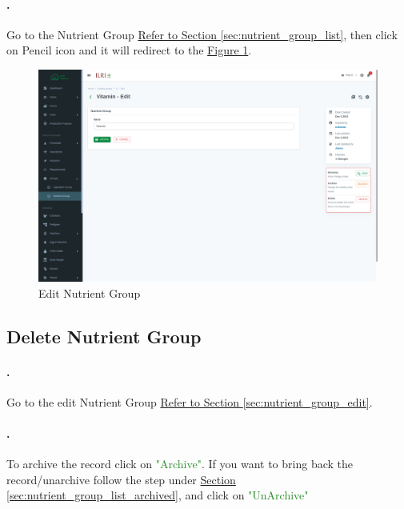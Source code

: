 \paragraph{.}Go to the Nutrient Group \hyperref[sec:nutrient_group_list]{Refer to Section \ref{sec:nutrient_group_list}}, then click on Pencil icon and it will redirect to the \hyperref[fig:nutrient_group_edit_page]{Figure \ref{fig:nutrient_group_edit_page}}.
\begin{figure}[h!]
  	\includegraphics[width=15cm]{screenshots/nutrient_group_edit_page.png}
  	\caption{Edit Nutrient Group}
  	\label{fig:nutrient_group_edit_page}
\end{figure}

\subsection{Delete Nutrient Group}
\setcounter{stepcounter}{1}
\paragraph{.}Go to the edit Nutrient Group \hyperref[sec:nutrient_group_edit]{Refer to Section \ref{sec:nutrient_group_edit}}.

\paragraph{.}To archive the record click on \textcolor{ForestGreen}{"Archive"}. If you want to bring back the record/unarchive follow the step under \hyperref[sec:nutrient_group_list_archived]{Section  \ref{sec:nutrient_group_list_archived}}, and click on \textcolor{ForestGreen}{"UnArchive"}


